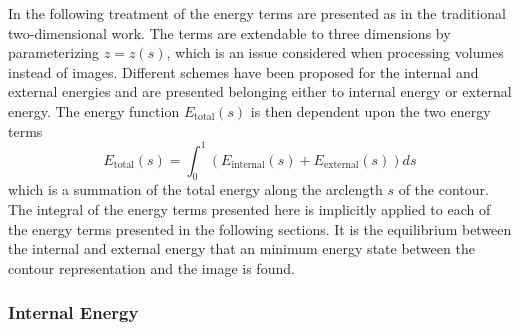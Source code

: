 In the following treatment of the energy terms are presented as in the
traditional two-dimensional work. The terms are extendable to three
dimensions by parameterizing $z = z(s)$, which is an issue considered
when processing volumes instead of images. Different schemes have been
proposed for the internal and external energies and are presented
belonging either to internal energy or external energy. The energy
function $E_{\text{total}}(s)$ is then dependent upon the two energy
terms
\begin{equation}
  \label{eq:energy-total}
  E_{\text{total}}(s) = \int_0^1(E_{\text{internal}}(s)+E_{\text{external}}(s))ds
\end{equation}
which is a summation of the total energy along the arclength $s$ of
the contour.  The integral of the energy terms presented here is
implicitly applied to each of the energy terms presented in the
following sections.  It is the equilibrium between the internal and
external energy that an minimum energy state between the contour
representation and the image is found.

\subsubsection{Internal Energy}
\label{sec:internal-energy}

